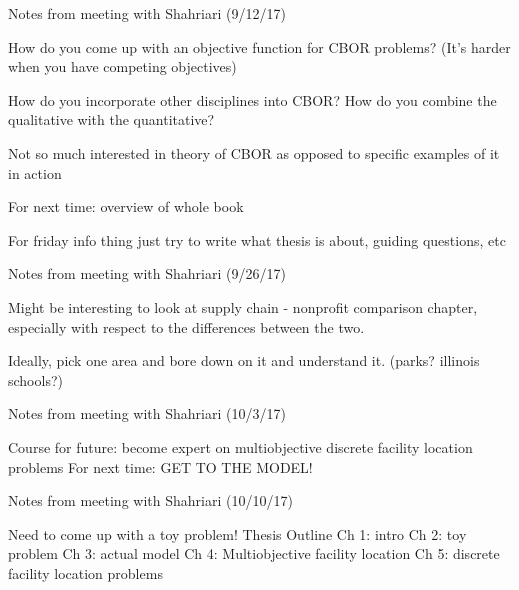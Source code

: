 \documentclass{article}
\begin{document}
Notes from meeting with Shahriari (9/12/17)

How do you come up with an objective function for CBOR problems? (It's harder when you have competing objectives)

How do you incorporate other disciplines into CBOR? How do you combine the qualitative with the quantitative? 

Not so much interested in theory of CBOR as opposed to specific examples of it in action

For next time: overview of whole book

For friday info thing just try to write what thesis is about, guiding questions, etc \newline \newline

Notes from meeting with Shahriari (9/26/17)

Might be interesting to look at supply chain - nonprofit comparison chapter, especially with respect to the differences between the two.

Ideally, pick one area and bore down on it and understand it. (parks? illinois schools?)


Notes from meeting with Shahriari (10/3/17)

Course for future: become expert on multiobjective discrete facility location problems
For next time: GET TO THE MODEL!


Notes from meeting with Shahriari (10/10/17)

Need to come up with a toy problem! \newline
Thesis Outline \newline
Ch 1: intro \newline
Ch 2: toy problem \newline
Ch 3: actual model \newline
Ch 4: Multiobjective facility location \newline
Ch 5: discrete facility location problems \newline
\end{document}
